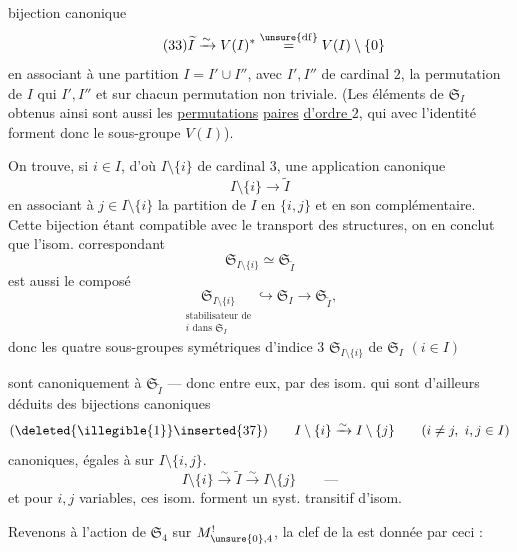 
bijection canonique
\[
\tag{33}
\widetilde I \xrightarrow{\sim} V(I)^*
\overset{\unsure{\mathrm{df}}}{=} V(I)\setminus\{0\}
\]
en associant à une partition $I=I'\cup I''$, avec
$I',I''$ de cardinal $2$, la  permutation
 de $I$
 qui  $I',I''$ et  sur
chacun  permutation non triviale. (Les éléments
de $\mathfrak{S}_I$ obtenus ainsi sont aussi les \uline{permutations}
\uline{paires} \uline{d'ordre $2$}, \deleted{\unsure{)}} qui avec l'identité forment
donc le sous-groupe $V(I)$).

On trouve, si $i\in I$, d'où $I\setminus\{i\}$ de
cardinal $3$,  une application canonique
\[
\tag{34}
I\setminus\{i\}\longrightarrow\widetilde I
\]
en associant à $j\in I\setminus\{i\}$ la partition
de $I$ en $\{i,j\}$ et en son complémentaire.
Cette bijection étant compatible avec le
transport des structures, on en conclut
que l'isom. correspondant
\[
\tag{35}
\mathfrak{S}_{I\setminus\{i\}}\simeq\mathfrak{S}_{\widetilde I}
\]
 est  aussi le composé
\[
\tag{36}
\underset{\substack{\text{stabilisateur de}\\ i\text{ dans }\mathfrak{S}_I}}
{\mathfrak{S}_{I\setminus\{i\}}}
\hookrightarrow\mathfrak{S}_I\longrightarrow\mathfrak{S}_{\widetilde I},
\]
donc les quatre sous-groupes symétriques
d'indice $3$ $\mathfrak{S}_{I\setminus\{i\}}$ de $\mathfrak{S}_I$ $(i\in I)$

sont canoniquement  à $\mathfrak{S}_{\widetilde I}$
--- donc entre eux,  par des isom. qui
 sont  d'ailleurs  déduits des bijections
canoniques 
\[
  (\deleted{\illegible{1}}\inserted{37})\qquad
  I\setminus\{i\}\xrightarrow{\sim}I\setminus\{j\}
  \qquad(i\ne j,\ i,j\in I)
\]
canoniques, égales à 
 sur $I\setminus\{i,j\}$.
\[
  I\setminus\{i\}\xrightarrow{\sim}\widetilde I
  \xrightarrow{\sim}I\setminus\{j\}
  \qquad\text{---}
\]
et pour $i,j$ variables, ces isom. forment un
syst. transitif d'isom.

Revenons à l'action de $\mathfrak{S}_4$ sur
$M_{\unsure{0},4}^{!}$, la clef de la 
est donnée par ceci :

